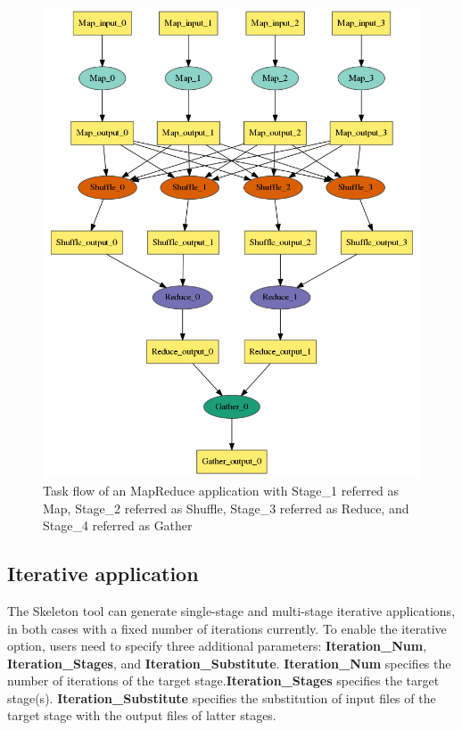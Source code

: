 \documentclass[10pt,a4paper]{article}
\begin{document}
\begin{figure}
   \includegraphics[width=120mm]{picture/mr}
\caption {Task flow of an MapReduce application with Stage\_1 referred as Map, Stage\_2 referred as Shuffle, Stage\_3 referred as Reduce, and Stage\_4 referred as Gather
   \label{fig:mr}
}
\end{figure}


\subsection{Iterative application}

The Skeleton tool can generate single-stage and multi-stage iterative applications, in both cases with a fixed number of iterations currently. To enable the iterative option,
users need to specify three additional parameters: \textbf{Iteration\_Num}, \textbf{Iteration\_Stages}, and \textbf{Iteration\_Substitute}. 
\textbf{Iteration\_Num} specifies 
the number of iterations of the target stage.\textbf{Iteration\_Stages} specifies the target stage(s). \textbf{Iteration\_Substitute} specifies the substitution
of input files of the target stage with the output files of latter stages.
\end{document}

